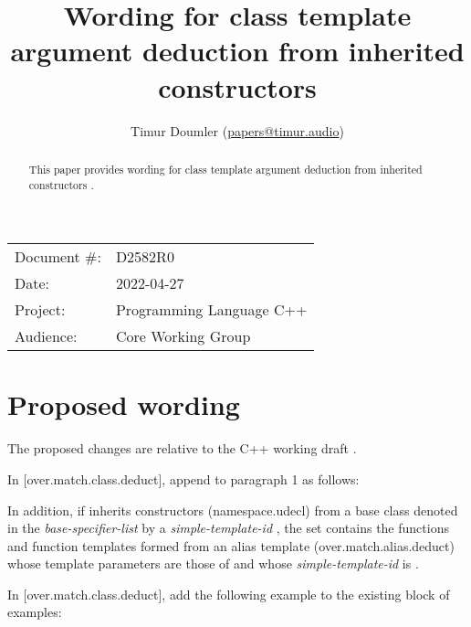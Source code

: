 

\newcommand{\forceindent}{\parindent=1em\indent\parindent=0pt\relax} %



\title{Wording for class template argument deduction from inherited constructors}
\author{
  Timur Doumler \small(\href{mailto:papers@timur.audio}{papers@timur.audio})
}
\date{}
\maketitle

\begin{tabular}{ll}
Document \#: & D2582R0 \\
Date: & 2022-04-27\\
Project: & Programming Language C++ \\
Audience: & Core Working Group
\end{tabular}


\begin{abstract}
This paper provides wording for class template argument deduction from inherited constructors \cite{P1021R5}.
\end{abstract}

\section{Proposed wording}

The proposed changes are relative to the C++ working draft \cite{N4910}. 

In [over.match.class.deduct], append to paragraph 1 as follows:

\begin{adjustwidth}{0.5cm}{0.5cm}
\begin{addedblock}
In addition, if  inherits constructors (namespace.udecl) from a base class denoted in the \emph{base-specifier-list} by a \emph{simple-template-id} , the set contains the functions and function templates formed from an alias template (over.match.alias.deduct) whose template parameters are those of  and whose \emph{simple-template-id} is .
\end{addedblock}
\end{adjustwidth}

In [over.match.class.deduct], add the following example to the existing block of examples:

